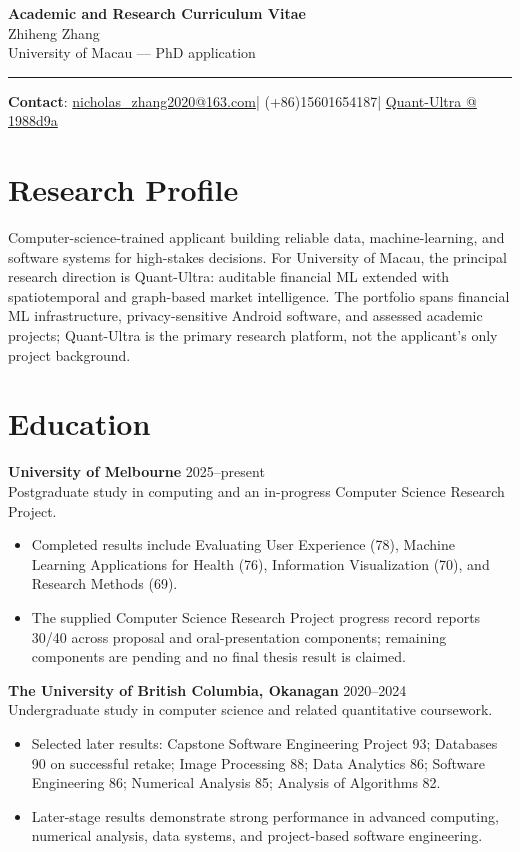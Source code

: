 \documentclass[11pt]{article}
\makeatletter
\newcommand{\ApplicantName}{Zhiheng Zhang}
\newcommand{\ApplicantEmail}{\href{mailto:nicholas_zhang2020@163.com}{nicholas\_zhang2020@163.com}}
\newcommand{\ApplicantPhone}{(+86)15601654187}
\newcommand{\ApplicantGitHub}{\href{https://github.com/zhiheng-zhang-Mera/Quant-Ultra/tree/1988d9a8530da91a8158de864d098ea869098923}{Quant-Ultra @ 1988d9a}}
\makeatother
\begin{document}
\begin{center}
{\LARGE\bfseries Academic and Research Curriculum Vitae}\\[0.25em]
{\large \ApplicantName}\\
University of Macau --- PhD application
\end{center}
\vspace{0.35em}\hrule\vspace{0.65em}

\textbf{Contact}: \ApplicantEmail\quad | \quad \ApplicantPhone\quad | \quad \ApplicantGitHub

\section*{Research Profile}
Computer-science-trained applicant building reliable data, machine-learning, and software systems for high-stakes decisions. For University of Macau, the principal research direction is Quant-Ultra: auditable financial ML extended with spatiotemporal and graph-based market intelligence. The portfolio spans financial ML infrastructure, privacy-sensitive Android software, and assessed academic projects; Quant-Ultra is the primary research platform, not the applicant's only project background.

\section*{Education}
\textbf{University of Melbourne} \hfill 2025--present\\
Postgraduate study in computing and an in-progress Computer Science Research Project.
\begin{itemize}
\item Completed results include Evaluating User Experience (78), Machine Learning Applications for Health (76), Information Visualization (70), and Research Methods (69).
\item The supplied Computer Science Research Project progress record reports 30/40 across proposal and oral-presentation components; remaining components are pending and no final thesis result is claimed.
\end{itemize}

\textbf{The University of British Columbia, Okanagan} \hfill 2020--2024\\
Undergraduate study in computer science and related quantitative coursework.
\begin{itemize}
\item Selected later results: Capstone Software Engineering Project 93; Databases 90 on successful retake; Image Processing 88; Data Analytics 86; Software Engineering 86; Numerical Analysis 85; Analysis of Algorithms 82.
\item Later-stage results demonstrate strong performance in advanced computing, numerical analysis, data systems, and project-based software engineering.
\end{itemize}
\end{document}
